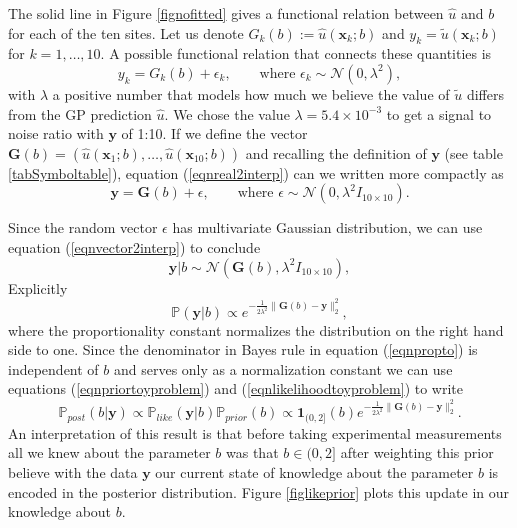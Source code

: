 \documentclass[12pt]{book}
\newcommand{\post}{\mathbb{P}_{post}}
\newcommand{\like}{\mathbb{P}_{like}}
\newcommand{\prior}{\mathbb{P}_{prior}}
\newcommand{\p}{\mathbb{P}}
\newcommand{\x}{\textbf{x}}
\newcommand{\y}{\textbf{y}}
\begin{document}
The solid line in Figure \ref{fignofitted} gives a functional relation between $\hat{u}$ and $b$ for each of the 
ten sites.
Let us denote $G_{k}(b):=\hat{u}(\x_{k};b)$ and $y_{k}=\tilde{u}(\x_{k};b)$ for $k=1,\ldots,10$. A possible 
functional relation
that connects these quantities is
\begin{equation}\label{eqnreal2interp}
y_{k}=G_{k}(b)+\epsilon_{k},\qquad\text{where } \epsilon_{k}\sim\mathcal{N}(0,\lambda^{2}),
\end{equation}
with $\lambda$ a positive number that models how much we believe the value of $\tilde{u}$ differs from the GP prediction $\hat{u}$. 
We chose the value $\lambda=5.4\times 10^{-3}$ to get a signal to noise ratio with $\y$ of 1:10.
If we define the vector  
$\textbf{G}(b)=(\hat{u}(\x_{1};b),\ldots,\hat{u}(\x_{10};b))$ and recalling the definition of $\y$ 
(see table \ref{tabSymboltable}), equation (\ref{eqnreal2interp}) can we written more compactly as
\begin{equation}\label{eqnvector2interp}
\textbf{y}=\textbf{G}(b)+\epsilon,\qquad\text{where }\epsilon\sim\mathcal{N}(0,\lambda^{2} I_{10\times 10}).
\end{equation}


Since the random vector $\epsilon$ has multivariate Gaussian distribution, we can use equation (\ref{eqnvector2interp})
to conclude \cite{Somersalo}
\begin{equation*}
\textbf{y}|b\sim \mathcal{N}(\textbf{G}(b),\lambda^{2} I_{10\times 10}),
\end{equation*}
Explicitly
\begin{equation}\label{eqnlikelihoodtoyproblem}
\p(\textbf{y}|b)\propto e^{-\frac{1}{2\lambda^{2}}\|\textbf{G}(b)-\textbf{y}\|_{2}^{2}},
\end{equation}
where the proportionality constant normalizes the distribution on the right hand side to one. Since
the denominator in Bayes rule in equation (\ref{eqnpropto}) is independent of $b$ and serves only 
as a normalization constant we can use equations (\ref{eqnpriortoyproblem}) and (\ref{eqnlikelihoodtoyproblem})  
to write 
\begin{equation}\label{eqnposteriorforb}
\post(b|\y)\propto\like(\y|b)\prior(b)\propto \textbf{1}_{(0,2]}(b)e^{-\frac{1}{2\lambda^{2}}\|\textbf{G}(b)-\textbf{y}\|_{2}^{2}}.
\end{equation}
An interpretation of this result is that before taking experimental measurements all we knew about the parameter $b$ was
that $b\in (0,2]$ after weighting this prior believe with the data $\y$ our current state of knowledge about the
parameter $b$ is encoded in the posterior distribution. Figure \ref{figlikeprior} plots this update in our knowledge about $b$.
\end{document}

